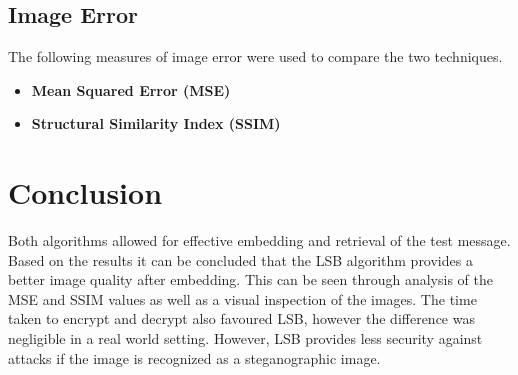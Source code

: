 \documentclass[11pt,letterpaper]{article}
\begin{document}
\subsection{Image Error}
The following measures of image error were used to compare the two techniques.
\begin{itemize}
\item \textbf{Mean Squared Error (MSE)}
\item \textbf{Structural Similarity Index (SSIM)}
\end{itemize}


\section{Conclusion}
Both algorithms allowed for effective embedding and retrieval of the test message. Based on the results it can be concluded that the LSB algorithm provides a better image quality after embedding. This can be seen through analysis of the MSE and SSIM values as well as a visual inspection of the images. The time taken to encrypt and decrypt also favoured LSB, however the difference was negligible in a real world setting. However, LSB provides less security against attacks if the image is recognized as a steganographic image.
\end{document}
